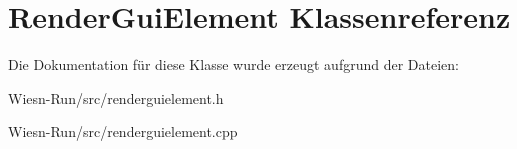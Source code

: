 \hypertarget{classRenderGuiElement}{\section{Render\-Gui\-Element Klassenreferenz}
\label{classRenderGuiElement}
}


Die Dokumentation für diese Klasse wurde erzeugt aufgrund der Dateien\-:\begin{DoxyCompactItemize}
\item 
Wiesn-\/\-Run/src/renderguielement.\-h\item 
Wiesn-\/\-Run/src/renderguielement.\-cpp\end{DoxyCompactItemize}
